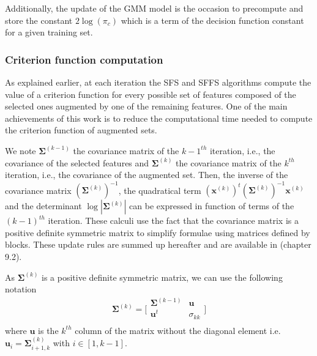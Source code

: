 \documentclass[a4paper,11pt,DIV=16]{scrartcl}
\begin{document}
        Additionally, the update of the GMM model is the occasion to precompute and store the constant $2 \log (\pi_c)$ which is a term of the decision function constant for a given training set.

        \subsubsection{Criterion function computation}

        As explained earlier, at each iteration the SFS and SFFS algorithms compute the value of a criterion function for every possible set of features composed of the selected ones augmented by one of the remaining features. One of the main achievements of this work is to reduce the computational time needed to compute the criterion function of augmented sets.

        We note $\boldsymbol{\Sigma}^{(k-1)}$ the covariance matrix of the $k-1^{th}$ iteration, i.e., the covariance of the selected features and $\boldsymbol{\Sigma}^{(k)}$ the covariance matrix of the $k^{th}$ iteration, i.e., the covariance of the augmented set. Then, the inverse of the covariance matrix $(\boldsymbol{\Sigma}^{(k)})^{-1}$, the quadratical term $(\mathbf{x}^{(k)})^t (\boldsymbol{\Sigma}^{(k)})^{-1} \mathbf{x}^{(k)}$ and the determinant $\log |\boldsymbol{\Sigma}^{(k)}|$ can be expressed in function of terms of the $(k-1)^{th}$ iteration. These calculi use the fact that the covariance matrix is a positive definite symmetric matrix to simplify formulae using matrices defined by blocks. These update rules are summed up hereafter and are available in \cite{webb2003statistical} (chapter 9.2).

        As $\boldsymbol{\Sigma}^{(k)}$ is a positive definite symmetric matrix, we can use the following notation
        \begin{equation*}
            \boldsymbol{\Sigma}^{(k)} =
            \bigg[\begin{array}{cc}
            \boldsymbol{\Sigma}^{(k-1)} & \mathbf{u}      \\
            \mathbf{u}^t          & \sigma_{kk} \\
            \end{array}\bigg]
        \end{equation*}
        where $\mathbf{u}$ is the $k^{th}$ column of the matrix without the diagonal element i.e. $\mathbf{u}_{i} = \boldsymbol{\Sigma}^{(k)}_{i+1,k}$ with $i \in [1,k-1]$.
\end{document}
